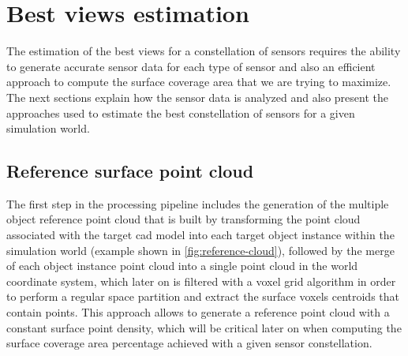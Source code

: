 \section{Best views estimation}\label{sec:best-views-estimation}

The estimation of the best views for a constellation of sensors requires the ability to generate accurate sensor data for each type of sensor and also an efficient approach to compute the surface coverage area that we are trying to maximize. The next sections explain how the sensor data is analyzed and also present the approaches used to estimate the best constellation of sensors for a given simulation world.

\subsection{Reference surface point cloud}

The first step in the processing pipeline includes the generation of the multiple object reference point cloud that is built by transforming the point cloud associated with the target \gls{cad} model into each target object instance within the simulation world (example shown in \cref{fig:reference-cloud}), followed by the merge of each object instance point cloud into a single point cloud in the world coordinate system, which later on is filtered with a voxel grid algorithm in order to perform a regular space partition and extract the surface voxels centroids that contain points. This approach allows to generate a reference point cloud with a constant surface point density, which will be critical later on when computing the surface coverage area percentage achieved with a given sensor constellation.


